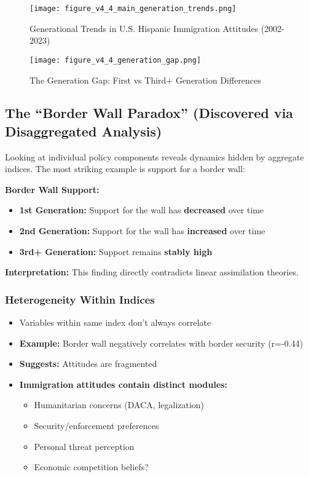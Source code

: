 \documentclass[11pt,letterpaper]{article}
\begin{document}
\begin{figure}[H]
    \centering
    \texttt{[image: figure\_v4\_4\_main\_generation\_trends.png]}
    \caption{Generational Trends in U.S. Hispanic Immigration Attitudes (2002-2023)}
    \label{fig:main_trends}
\end{figure}

\begin{figure}[H]
    \centering
    \texttt{[image: figure\_v4\_4\_generation\_gap.png]}
    \caption{The Generation Gap: First vs Third+ Generation Differences}
    \label{fig:generation_gap}
\end{figure}

\subsection{The ``Border Wall Paradox'' (Discovered via Disaggregated Analysis)}

Looking at individual policy components reveals dynamics hidden by aggregate indices. The most striking example is support for a border wall:

\textbf{Border Wall Support:}
\begin{itemize}
    \item \textbf{1st Generation:} Support for the wall has \textbf{decreased} over time
    \item \textbf{2nd Generation:} Support for the wall has \textbf{increased} over time
    \item \textbf{3rd+ Generation:} Support remains \textbf{stably high}
\end{itemize}

\textbf{Interpretation:} This finding directly contradicts linear assimilation theories.

\subsubsection{Heterogeneity Within Indices}
\begin{itemize}
    \item Variables within same index don't always correlate
    \item \textbf{Example:} Border wall negatively correlates with border security (r=-0.44)
    \item \textbf{Suggests:} Attitudes are fragmented
    \item \textbf{Immigration attitudes contain distinct modules:}
    \begin{itemize}
        \item Humanitarian concerns (DACA, legalization)
        \item Security/enforcement preferences
        \item Personal threat perception
        \item Economic competition beliefs?
    \end{itemize}
\end{itemize}
\end{document}
